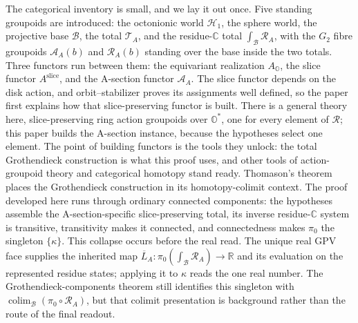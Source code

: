 \documentclass[11pt]{article}
\newcommand{\OO}{\mathbb{O}}
\newcommand{\CC}{\mathbb{C}}
\newcommand{\RR}{\mathbb{R}}
\newcommand{\Ostar}{\OO^{*}}
\theoremstyle{plain}
\theoremstyle{definition}
\theoremstyle{remark}
\begin{document}
The categorical inventory is small, and we lay it out once. Five standing
groupoids are introduced: the octonionic world $\mathcal H_1$, the sphere
world, the projective base $\mathcal B$, the total $\mathcal T_A$, and the
residue-$\CC$ total $\int_{\mathcal B}\mathcal R_A$, with the $G_2$ fibre
groupoids $\mathcal A_A(b)$ and $\mathcal R_A(b)$ standing over the base
inside the two totals. Three functors run between them: the equivariant
realization $A_{\OO}$, the slice functor $A^{\mathrm{slice}}$, and the
A-section functor $\mathcal A_A$. The slice functor depends on the disk action,
and orbit--stabilizer proves its assignments well defined, so the paper first
explains how that slice-preserving functor is built. There is a
general theory here, slice-preserving ring action groupoids over $\Ostar$,
one for every element of $\mathcal R$; this paper builds the A-section
instance, because the hypotheses select one element. The point of building
functors is the tools they unlock: the total Grothendieck construction is
what this proof uses, and other tools of action-groupoid theory and
categorical homotopy stand ready. Thomason's theorem \cite{Thomason79}
places the Grothendieck construction in its homotopy-colimit context. The
proof developed here runs through ordinary connected components: the
hypotheses assemble the A-section-specific slice-preserving total, its inverse
residue-$\CC$ system is transitive, transitivity makes it connected, and
connectedness makes $\pi_0$ the singleton $\{\kappa\}$. This collapse occurs
before the real read. The unique real GPV face supplies the inherited map
$\overline L_A:\pi_0(\int_{\mathcal B}\mathcal R_A)\to\RR$ and its evaluation
on the represented residue states; applying it to $\kappa$ reads the one real
number. The Grothendieck-components theorem still identifies this singleton
with $\operatorname*{colim}_{\mathcal B}(\pi_0\circ\mathcal R_A)$, but that
colimit presentation is background rather than the route of the final readout.
\end{document}
